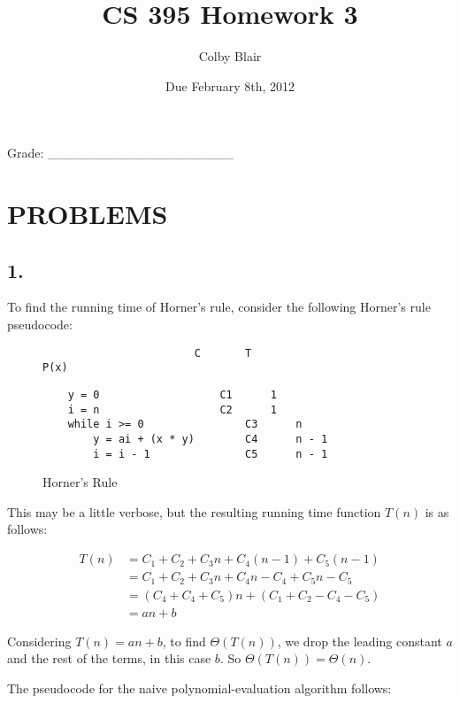 \documentclass[11pt,letterpaper]{article}
\date{Due February 8th, 2012}
\title{CS 395 Homework 3}
\author{Colby Blair}
\begin{document}
\maketitle

\begin{center}

Grade: \_\_\_\_\_\_\_\_\_\_\_\_\_\_\_\_\_\_\_\_
\end{center}

\thispagestyle{empty}

\pagebreak


\section*{PROBLEMS}

\subsection*{1.}
To find the running time of Horner's rule, consider the following Horner's rule pseudocode:
\begin{figure}[!h]

\scriptsize
\begin{lstlisting}
						C 		T
P(x)
\end{lstlisting}

\lstset{numbers=left}
\begin{lstlisting}
	y = 0					C1		1
	i = n 					C2		1
	while i >= 0 				C3		n
		y = ai + (x * y) 		C4 		n - 1
		i = i - 1 				C5 		n - 1
\end{lstlisting}
\normalsize

\caption{Horner's Rule}
\label{horners_rule}
\end{figure}

This may be a little verbose, but the resulting running time function $T(n)$ is as follows:

\begin{eqnarray}
T(n) 	&	= C_1 + C_2 + C_3n + C_4(n-1) + C_5(n - 1) \\
	&	= C_1 + C_2 + C_3n + C_4n - C_4 + C_5n - C_5 \\
	&	= (C_4 + C_4 + C_5)n + (C_1 + C_2 - C_4 - C_5) \\
	&	= an + b
\end{eqnarray}

Considering $T(n) = an + b$, to find $\Theta(T(n))$, we drop the leading constant $a$ and the rest of the 
terms, in this case $b$. So $\Theta(T(n)) = \Theta(n). $

The pseudocode for the naive polynomial-evaluation algorithm follows:
\end{document}
